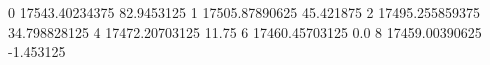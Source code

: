 0 17543.40234375 82.9453125
1 17505.87890625 45.421875
2 17495.255859375 34.798828125
4 17472.20703125 11.75
6 17460.45703125 0.0
8 17459.00390625 -1.453125
